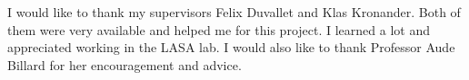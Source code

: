 I would like to thank my supervisors Felix Duvallet and Klas Kronander. Both of them were very available and helped me for this project. I learned a lot and appreciated working in the LASA lab. I would also like to thank Professor Aude Billard for her encouragement and advice.
